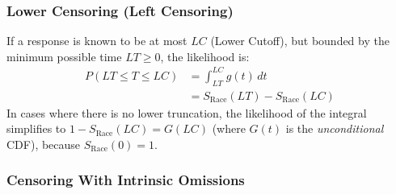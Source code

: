 \documentclass[12pt,a4paper,one side]{article}
\begin{document}
\subsubsection*{Lower Censoring (Left Censoring)}
If a response is known to be at most $LC$ (Lower Cutoff), but bounded by the minimum possible time $LT \geq 0$, the likelihood is:
\begin{align}
    P(LT \leq T \leq LC) &= \int_{LT}^{LC} g(t) \, dt \nonumber \\
    &= S_{\text{Race}}(LT) - S_{\text{Race}}(LC)
\end{align}
In cases where there is no lower truncation, the likelihood of the integral simplifies to $1-S_{\text{Race}}(LC) = G(LC)$ (where $G(t)$ is the \textit{unconditional} CDF), because $S_{\text{Race}}(0) = 1$. 

\subsubsection*{Censoring With Intrinsic Omissions}
\end{document}
